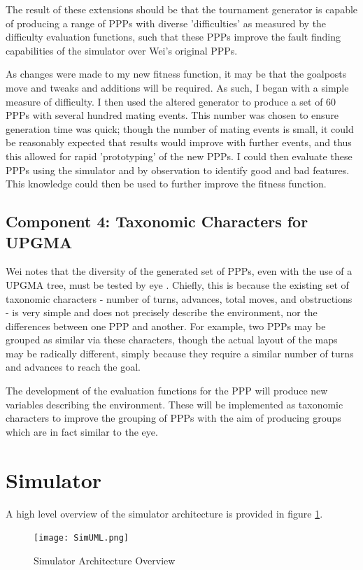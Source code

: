 \documentclass[authoryearcitations]{UoYCSproject}
\begin{document}
The result of these extensions should be that the tournament  generator is capable of producing a range of PPPs with diverse 'difficulties' as measured by the difficulty evaluation functions, such that these PPPs improve the fault finding capabilities of the simulator over Wei's original PPPs.

As changes were made to my new fitness function, it may be that the goalposts move and tweaks and additions will be required. As such, I began with a simple measure of difficulty. I then used the altered generator to produce a set of 60 PPPs with several hundred mating events. This number was chosen to ensure generation time was quick; though the number of mating events is small, it could be reasonably expected that results would improve with further events, and thus this allowed for rapid 'prototyping' of the new PPPs. I could then evaluate these PPPs using the simulator and by observation to identify good and bad features. This knowledge could then be used to further improve the fitness function.

\subsection{Component 4: Taxonomic Characters for UPGMA}
\label{sec:da_3_4}
Wei notes that the diversity of the generated set of PPPs, even with the use of a UPGMA tree, must be tested by eye \cite[p.66]{wei}. Chiefly, this is because the existing set of taxonomic characters - number of turns, advances, total moves, and obstructions - is very simple and does not precisely describe the environment, nor the differences between one PPP and another. For example, two PPPs may be grouped as similar via these characters, though the actual layout of the maps may be radically different, simply because they require a similar number of turns and advances to reach the goal.

The development of the evaluation functions for the PPP will produce new variables describing the environment. These will be implemented as taxonomic characters to improve the grouping of PPPs with the aim of producing groups which are in fact similar to the eye.

\section{Simulator}
\label{sec:da_4}
A high level overview of the simulator architecture is provided in figure \ref{fig:sim_uml}.

\begin{figure}
\graphicspath{ {DesignImpPics/} }
\texttt{[image: SimUML.png]}
\caption{Simulator Architecture Overview}
\label{fig:sim_uml}
\end{figure}
\end{document}
